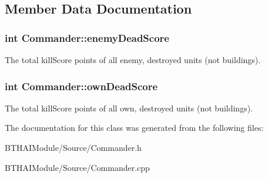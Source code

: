\subsection{Member Data Documentation}
\hypertarget{class_commander_a92767d5f0687dae52eb48ea1d7bcc7e1}{
\subsubsection[{enemy\-Dead\-Score}]{\setlength{\rightskip}{0pt plus 5cm}int Commander\-::enemy\-Dead\-Score}}\label{class_commander_a92767d5f0687dae52eb48ea1d7bcc7e1}
The total kill\-Score points of all enemy, destroyed units (not buildings). \hypertarget{class_commander_a3691e42fa66318d12bc24462915f9786}{
\subsubsection[{own\-Dead\-Score}]{\setlength{\rightskip}{0pt plus 5cm}int Commander\-::own\-Dead\-Score}}\label{class_commander_a3691e42fa66318d12bc24462915f9786}
The total kill\-Score points of all own, destroyed units (not buildings). 

The documentation for this class was generated from the following files\-:\begin{DoxyCompactItemize}
\item 
B\-T\-H\-A\-I\-Module/\-Source/Commander.\-h\item 
B\-T\-H\-A\-I\-Module/\-Source/Commander.\-cpp\end{DoxyCompactItemize}
